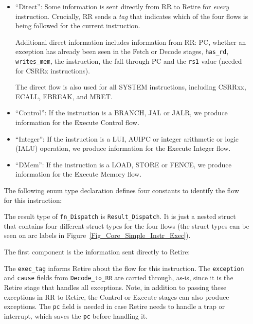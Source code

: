 \begin{itemize}

  \item ``Direct'': Some information is sent directly from RR to
        Retire for \emph{every} instruction.  Crucially, RR sends a
        \emph{tag} that indicates which of the four flows is being
        followed for the current instruction.

        Additional direct information includes information from RR:
        PC, whether an exception has already been seen in the Fetch or
        Decode stages, \verb|has_rd|, \verb|writes_mem|, the
        instruction, the fall-through PC and the \verb|rs1| value
        (needed for CSRRx instructions).

        The direct flow is also used for all SYSTEM instructions,
        including CSRRxx, ECALL, EBREAK, and MRET.

  \item ``Control'': If the instruction is a BRANCH, JAL or JALR, we
        produce information for the Execute Control flow.

  \item ``Integer'': If the instruction is a LUI, AUIPC or integer
        arithmetic or logic (IALU) operation, we produce information
        for the Execute Integer flow.

  \item ``DMem'': If the instruction is a LOAD, STORE or FENCE, we
        produce information for the Execute Memory flow.

\end{itemize}

The following enum type declaration defines four constants to identify
the flow for this instruction:


The result type of \verb|fn_Dispatch| is \verb|Result_Dispatch|.  It
is just a nested struct that contains four different struct types for
the four flows (the struct types can be seen on arc labels in
Figure~\ref{Fig_Core_Simple_Instr_Exec}).


The first component is the information sent directly to Retire:


The \verb|exec_tag| informs Retire about the flow for this
instruction.  The {\tt exception} and {\tt cause} fields from
\verb|Decode_to_RR| are carried through, as-is, since it is the Retire
stage that handles all exceptions.  Note, in addition to passing these
exceptions in RR to Retire, the Control or Execute stages can also
produce exceptions.  The {\tt pc} field is needed in case Retire needs
to handle a trap or interrupt, which saves the {\tt pc} before
handling it.

